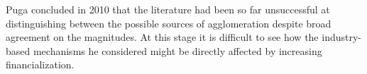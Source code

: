 Puga \cite{pugaMagnitudeCausesAgglomeration2010} concluded in 2010 that the literature had been so far unsuccessful at distinguishing between the possible sources of agglomeration  despite broad agreement on the magnitudes. 
At this stage it is difficult to see how the industry-based mechanisms he considered might be directly affected by increasing financialization.







